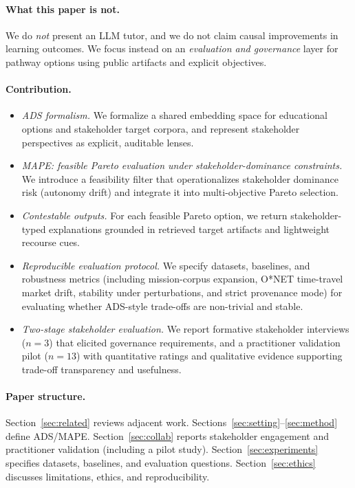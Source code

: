\documentclass[sigconf,review]{acmart}
\newcommand{\ADS}{\textsc{ADS}\xspace}
\newcommand{\MAPE}{\textsc{MAPE}\xspace}
\begin{document}
\paragraph{What this paper is not.}
We do \emph{not} present an LLM tutor, and we do not claim causal improvements in learning outcomes. We focus instead on an \emph{evaluation and governance} layer for pathway options using public artifacts and explicit objectives.

\paragraph{Contribution.}
\begin{itemize}
  \item \textit{\ADS formalism.} We formalize a shared embedding space for educational options and stakeholder target corpora, and represent stakeholder perspectives as explicit, auditable lenses.
  \item \textit{\MAPE: feasible Pareto evaluation under stakeholder-dominance constraints.} We introduce a feasibility filter that operationalizes stakeholder dominance risk (autonomy drift) and integrate it into multi-objective Pareto selection.
  \item \textit{Contestable outputs.} For each feasible Pareto option, we return stakeholder-typed explanations grounded in retrieved target artifacts and lightweight recourse cues.
  \item \textit{Reproducible evaluation protocol.} We specify datasets, baselines, and robustness metrics (including mission-corpus expansion, O*NET time-travel market drift, stability under perturbations, and strict provenance mode) for evaluating whether ADS-style trade-offs are non-trivial and stable.
  \item \textit{Two-stage stakeholder evaluation.} We report formative stakeholder interviews ($n{=}3$) that elicited governance requirements, and a practitioner validation pilot ($n{=}13$) with quantitative ratings and qualitative evidence supporting trade-off transparency and usefulness.
\end{itemize}

\paragraph{Paper structure.}
Section~\ref{sec:related} reviews adjacent work. Sections~\ref{sec:setting}--\ref{sec:method} define \ADS/\MAPE. Section~\ref{sec:collab} reports stakeholder engagement and practitioner validation (including a pilot study). Section~\ref{sec:experiments} specifies datasets, baselines, and evaluation questions. Section~\ref{sec:ethics} discusses limitations, ethics, and reproducibility.
\end{document}

